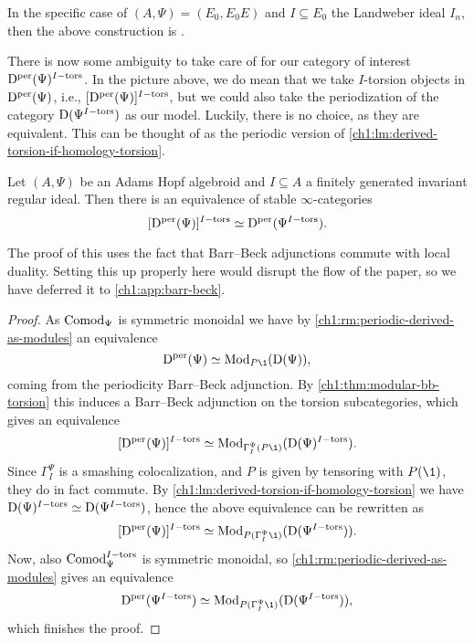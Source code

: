 \begin{remark}
    In the specific case of $(A, \Psi) = (E_0, E_0E)$ and $I\subseteq E_0$ the Landweber ideal $I_n$, then the above construction is \cite[3.12]{barthel-schlank-stapleton_2021}. 
\end{remark}

There is now some ambiguity to take care of for our category of interest $\mathrm{D}^{\mathrm{per}}(\Psi)^{I-\mathrm{tors}}$. In the picture above, we do mean that we take $I$-torsion objects in $\mathrm{D}^{\mathrm{per}}(\Psi)$, i.e., $[\mathrm{D}^{\mathrm{per}}(\Psi)]^{I-\mathrm{tors}}$, but we could also take the periodization of the category $\mathrm{D}(\Psi^{I-\mathrm{tors}})$ as our model. Luckily, there is no choice, as they are equivalent. This can be thought of as the periodic version of \cref{ch1:lm:derived-torsion-if-homology-torsion}.

\begin{theorem}
    \label{ch1:thm:pulling-out-torsion}
    Let $(A, \Psi)$ be an Adams Hopf algebroid and $I\subseteq A$ a finitely generated invariant regular ideal. Then there is an equivalence of stable $\infty$-categories 
    $$[\mathrm{D}^{\mathrm{per}}(\Psi)]^{I-\mathrm{tors}}\simeq \mathrm{D}^{\mathrm{per}}(\Psi^{I-\mathrm{tors}}).$$
\end{theorem}

\begin{remark}
    The proof of this uses the fact that Barr--Beck adjunctions commute with local duality. Setting this up properly here would disrupt the flow of the paper, so we have deferred it to \cref{ch1:app:barr-beck}.
\end{remark} 

\begin{proof}
    As $\mathrm{Comod}_\Psi$ is symmetric monoidal we have by \cref{ch1:rm:periodic-derived-as-modules} an equivalence
    \[\Dper(\Psi)\simeq \Mod_{P\1}(\Der(\Psi)),\]
    coming from the periodicity Barr--Beck adjunction.
    By \cref{ch1:thm:modular-bb-torsion} this induces a Barr--Beck adjunction on the torsion subcategories, which gives an equivalence 
    $$[\Dper(\Psi)]\Itors\simeq \Mod_{\Gamma_I^\Psi (P\1)}(\Der(\Psi)\Itors).$$
    Since $\Gamma_I^\Psi$ is a smashing colocalization, and $P$ is given by tensoring with $P(\1)$, they do in fact commute. By \cref{ch1:lm:derived-torsion-if-homology-torsion} we have $\mathrm{D}(\Psi)^{I-\mathrm{tors}}\simeq \mathrm{D}(\Psi^{I-\mathrm{tors}})$, hence the above equivalence can be rewritten as
    $$[\Dper(\Psi)]\Itors\simeq \Mod_{P(\Gamma_I^\Psi \1)}(\Der(\Psi\Itors)).$$
    Now, also $\mathrm{Comod}_\Psi^{I-\mathrm{tors}}$ is symmetric monoidal, so \cref{ch1:rm:periodic-derived-as-modules} gives an equivalence 
    \[\Dper(\Psi\Itors)\simeq \Mod_{P(\Gamma_I^\Psi\1)}(\Der(\Psi\Itors)),\]which finishes the proof.
\end{proof}

